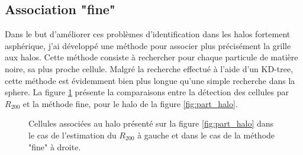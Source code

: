 \subsection{Association "fine"}

Dans le but d'améliorer ces problèmes d'identification dans les halos fortement asphérique, j'ai développé une méthode pour associer plus précisément la grille aux halos.
Cette méthode consiste à rechercher pour chaque particule de matière noire, sa plus proche cellule.
Malgré la recherche effectué à l'aide d'un KD-tree, cette méthode est évidemment bien plus longue qu'une simple recherche dans la sphere.
La figure \ref{fig:R200_fine} présente la comparaisons entre la détection des cellules par $R_{200}$ et la méthode fine, pour le halo de la figure \ref{fig:part_halo}.

\begin{figure}
    \caption[Méthodes d'association matière noire - grille]{Cellules associées au halo présenté sur la figure \ref{fig:part_halo} dans le cas de l'estimation du $R_{200}$ à gauche et dans le cas de la méthode "fine" à droite.       
 	\label{fig:R200_fine}}
\end{figure}

